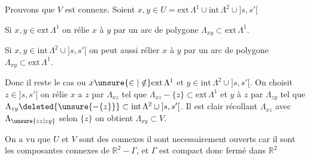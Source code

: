 Prouvons que $V$ est connexe. Soient $x,y\in U=\mathrm{ext}\,\Lambda^{1}\cup\mathrm{int}\,\Lambda^{2}\cup{]s,s'[}$

Si $x,y\in\mathrm{ext}\,\Lambda^{1}$ on rélie $x$ à $y$ par un arc de polygone $\Lambda_{xy}\subset\mathrm{ext}\,\Lambda^{1}$.

Si $x,y\in\mathrm{int}\,\Lambda^{2}\cup{]s,s'[}$ on peut aussi rélier $x$ à $y$ par un arc de polygone $\Lambda_{xy}\subset\mathrm{ext}\,\Lambda^{1}$.

Donc il reste le cas ou $x\unsure{\in|\notin}\mathrm{ext}\,\Lambda^{1}$ et $y\in\mathrm{int}\,\Lambda^{2}\cup{]s,s'[}$. On choisit $z\in{]s,s'[}$ on rélie $x$ a $z$ par $\Lambda_{xz}$ tel que $\Lambda_{xz}-\{z\}\subset\mathrm{ext}\,\Lambda^{1}$ et $y$ à $z$ par $\Lambda_{zy}$ tel que $\Lambda_{zy}\deleted{\unsure{-\{z\}}}\subset\mathrm{int}\,\Lambda^{2}\cup{]s,s'[}$. Il est clair  récollant $\Lambda_{xz}$ avec $\Lambda_{\unsure{zz|zy}}$ selon $\{z\}$ on obtient $\Lambda_{xy}\subset V$.

On a vu que $U$ et $V$ sont des connexes il sont necessairement ouverts car il sont les composantes connexes de $\mathbb{R}^{2}-\Gamma$, et $\Gamma$ est compact donc fermé dans $\mathbb{R}^{2}$\unsure{,|;|)}

\hfill {}
